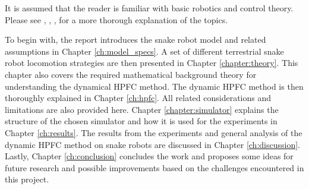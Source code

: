 It is assumed that the reader is familiar with basic robotics and control theory. Please see \cite{lynch2017modern}, \cite{lynch2017modernCompTorque}, \cite{waldron2016kinematics}, \cite{liljeback2012snake} for a more thorough explanation of the topics.

To begin with, the report introduces the snake robot model and related assumptions in Chapter \ref{ch:model_specs}. A set of different terrestrial snake robot locomotion strategies are then presented in Chapter \ref{chapter:theory}. This chapter also covers the required mathematical background theory for understanding the dynamical HPFC method. The dynamic HPFC method is then thoroughly explained in Chapter \ref{ch:hpfc}. All related considerations and limitations are also provided here. Chapter \ref{chapter:simulator} explains the structure of the chosen simulator and how it is used for the experiments in Chapter \ref{ch:results}. The results from the experiments and general analysis of the dynamic HPFC method on snake robots are discussed in Chapter \ref{ch:discussion}. Lastly, Chapter \ref{ch:conclusion} concludes the work and proposes some ideas for future research and possible improvements based on the challenges encountered in this project.